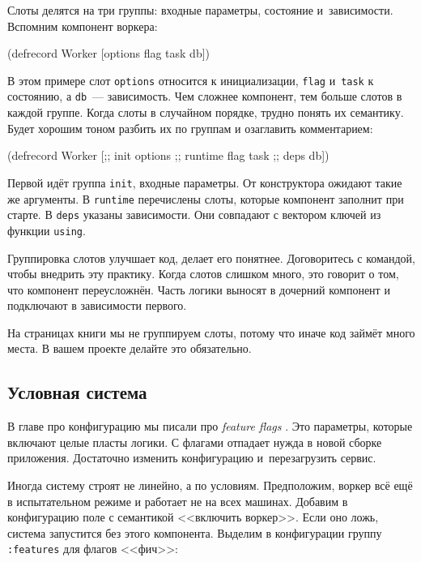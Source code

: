 
Слоты делятся на три группы: входные параметры, состояние
и~зависимости. Вспомним компонент воркера:

\begin{english}
  \begin{clojure}
(defrecord Worker
    [options flag task db])
  \end{clojure}
\end{english}

В этом примере слот \verb|options| относится к инициализации, \verb|flag|
и~\verb|task| к состоянию, а \verb|db|~--- зависимость. Чем сложнее компонент,
тем больше слотов в каждой группе. Когда слоты в случайном порядке, трудно
понять их семантику. Будет хорошим тоном разбить их по группам и озаглавить
комментарием:

\begin{english}
  \begin{clojure}
(defrecord Worker
    [;; init
     options
     ;; runtime
     flag
     task
     ;; deps
     db])
  \end{clojure}
\end{english}

Первой идёт группа \verb|init|, входные параметры. От конструктора ожидают
такие же аргументы. В \verb|runtime| перечислены слоты, которые компонент
заполнит при старте. В \verb|deps| указаны зависимости. Они совпадают с
вектором ключей из функции \verb|using|.

Группировка слотов улучшает код, делает его понятнее. Договоритесь с командой,
чтобы внедрить эту практику. Когда слотов слишком много, это говорит о том, что
компонент переусложнён. Часть логики выносят в дочерний компонент и подключают в
зависимости первого.

На страницах книги мы не группируем слоты, потому что иначе код займёт много
места. В вашем проекте делайте это обязательно.

\subsection{Условная система}


В главе про конфигурацию мы писали про \emph{feature flags} .
Это параметры, которые включают целые пласты логики. С флагами отпадает нужда в новой сборке
приложения. Достаточно изменить конфигурацию и~перезагрузить сервис.

Иногда систему строят не линейно, а по условиям. Предположим, воркер всё ещё в
испытательном режиме и работает не на всех машинах. Добавим в конфигурацию поле
с семантикой <<включить воркер>>. Если оно ложь, система запустится без этого
компонента. Выделим в конфигурации группу \verb|:features| для флагов <<фич>>:

